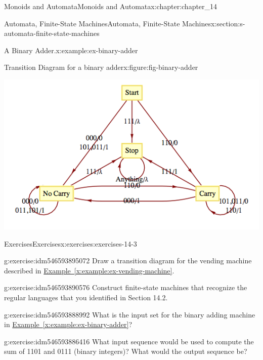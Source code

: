 \documentclass[oneside,10pt,]{book}
\newcommand{\xreffont}{\relax}
\numberwithin{equation}{section}
\begin{document}
\begin{chapterptx}{Monoids and Automata}{}{Monoids and Automata}{}{}{x:chapter:chapter_14}
\begin{sectionptx}{Automata, Finite-State Machines}{}{Automata, Finite-State Machines}{}{}{x:section:s-automata-finite-state-machines}
\begin{example}{A Binary Adder.}{x:example:ex-binary-adder}
\begin{figureptx}{Transition Diagram for a binary adder}{x:figure:fig-binary-adder}{}%
\begin{image}{0.1}{0.8}{0.1}%
\includegraphics[width=\linewidth]{images/fig-binary-adder.png}
\end{image}%
\tcblower
\end{figureptx}%
\end{example}
%
%
\typeout{************************************************}
\typeout{************************************************}
%
\begin{exercises-subsection}{Exercises}{}{Exercises}{}{}{x:exercises:exercises-14-3}
\begin{divisionexercise}{1}{}{}{g:exercise:idm546593895072}%
Draw a transition diagram for the vending machine described in \hyperref[x:example:ex-vending-machine]{Example~{\xreffont\ref{x:example:ex-vending-machine}}}.%
\end{divisionexercise}%
\begin{divisionexercise}{2}{}{}{g:exercise:idm546593890576}%
Construct finite-state machines that recognize the regular languages that you identified in Section 14.2.%
\end{divisionexercise}%
\begin{divisionexercise}{3}{}{}{g:exercise:idm546593888992}%
What is the input set for the binary adding machine in \hyperref[x:example:ex-binary-adder]{Example~{\xreffont\ref{x:example:ex-binary-adder}}}?%
\end{divisionexercise}%
\begin{divisionexercise}{4}{}{}{g:exercise:idm546593886416}%
What input sequence would be used to compute the sum of 1101 and 0111 (binary integers)? What would the output sequence be?%

\end{divisionexercise}
\end{exercises-subsection}
\end{sectionptx}
\end{chapterptx}
\end{document}

